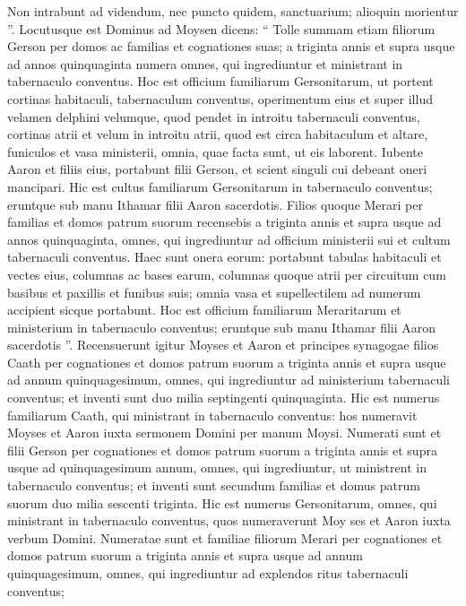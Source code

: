 \begin{biblechapter}
\begin{biblechapter}
\begin{biblechapter}
\begin{biblechapter}
\verse Non intrabunt ad videndum, nec puncto quidem, sanctuarium; alioquin morientur ”.
 \verse Locutusque est Dominus ad Moysen dicens: 
\verse “ Tolle summam etiam filiorum Gerson per domos ac familias et cognationes suas; 
\verse a triginta annis et supra usque ad annos quinquaginta numera omnes, qui ingrediuntur et ministrant in tabernaculo conventus.
 \verse Hoc est officium familiarum Gersonitarum, 
\verse ut portent cortinas habitaculi, tabernaculum conventus, operimentum eius et super illud velamen delphini velumque, quod pendet in introitu tabernaculi conventus, 
\verse cortinas atrii et velum in introitu atrii, quod est circa habitaculum et altare, funiculos et vasa ministerii, omnia, quae facta sunt, ut eis laborent. 
\verse Iubente Aaron et filiis eius, portabunt filii Gerson, et scient singuli cui debeant oneri mancipari. 
\verse Hic est cultus familiarum Gersonitarum in tabernaculo conventus; eruntque sub manu Ithamar filii Aaron sacerdotis.
 \verse Filios quoque Merari per familias et domos patrum suorum recensebis 
\verse a triginta annis et supra usque ad annos quinquaginta, omnes, qui ingrediuntur ad officium ministerii sui et cultum tabernaculi conventus.
 \verse Haec sunt onera eorum: portabunt tabulas habitaculi et vectes eius, columnas ac bases earum, 
\verse columnas quoque atrii per circuitum cum basibus et paxillis et funibus suis; omnia vasa et supellectilem ad numerum accipient sicque portabunt. 
\verse Hoc est officium familiarum Meraritarum et ministerium in tabernaculo conventus; eruntque sub manu Ithamar filii Aaron sacerdotis ”.
 \verse Recensuerunt igitur Moyses et Aaron et principes synagogae filios Caath per cognationes et domos patrum suorum 
\verse a triginta annis et supra usque ad annum quinquagesimum, omnes, qui ingrediuntur ad ministerium tabernaculi conventus; 
\verse et inventi sunt duo milia septingenti quinquaginta. 
\verse Hic est numerus familiarum Caath, qui ministrant in tabernaculo conventus: hos numeravit Moyses et Aaron iuxta sermonem Domini per manum Moysi.
 \verse Numerati sunt et filii Gerson per cognationes et domos patrum suorum 
\verse a triginta annis et supra usque ad quinquagesimum annum, omnes, qui ingrediuntur, ut ministrent in tabernaculo conventus; 
\verse et inventi sunt secundum familias et domus patrum suorum duo milia sescenti triginta. 
\verse Hic est numerus Gersonitarum, omnes, qui ministrant in tabernaculo conventus, quos numeraverunt Moy ses et Aaron iuxta verbum Domini. 
\verse Numeratae sunt et familiae filiorum Merari per cognationes et domos patrum suorum 
\verse a triginta annis et supra usque ad annum quinquagesimum, omnes, qui ingrediuntur ad explendos ritus tabernaculi conventus; 

\end{biblechapter}
\end{biblechapter}
\end{biblechapter}
\end{biblechapter}
